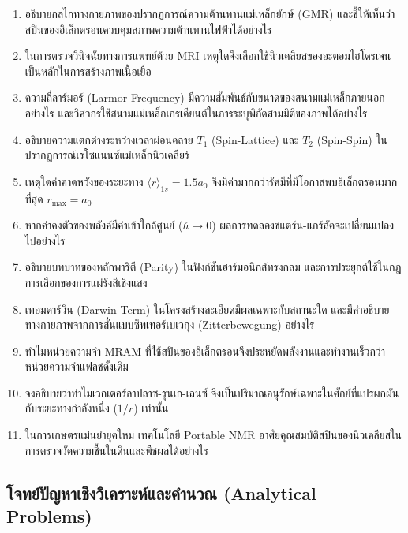 \begin{enumerate}[label=\textbf{\arabic*.}]
    \item อธิบายกลไกทางกายภาพของปรากฏการณ์ความต้านทานแม่เหล็กยักษ์ (GMR) และชี้ให้เห็นว่าสปินของอิเล็กตรอนควบคุมสภาพความต้านทานไฟฟ้าได้อย่างไร
    \item ในการตรวจวินิจฉัยทางการแพทย์ด้วย MRI เหตุใดจึงเลือกใช้นิวเคลียสของอะตอมไฮโดรเจนเป็นหลักในการสร้างภาพเนื้อเยื่อ
    \item ความถี่ลาร์มอร์ (Larmor Frequency) มีความสัมพันธ์กับขนาดของสนามแม่เหล็กภายนอกอย่างไร และวิศวกรใช้สนามแม่เหล็กเกรเดียนต์ในการระบุพิกัดสามมิติของภาพได้อย่างไร
    \item อธิบายความแตกต่างระหว่างเวลาผ่อนคลาย $T_1$ (Spin-Lattice) และ $T_2$ (Spin-Spin) ในปรากฏการณ์เรโซแนนซ์แม่เหล็กนิวเคลียร์
    \item เหตุใดค่าคาดหวังของระยะทาง $\langle r \rangle_{1s} = 1.5 a_0$ จึงมีค่ามากกว่ารัศมีที่มีโอกาสพบอิเล็กตรอนมากที่สุด $r_{\text{max}} = a_0$
    \item หากค่าคงตัวของพลังค์มีค่าเข้าใกล้ศูนย์ ($\hbar \to 0$) ผลการทดลองชแตร์น-แกร์ลัคจะเปลี่ยนแปลงไปอย่างไร
    \item อธิบายบทบาทของหลักพาริตี (Parity) ในฟังก์ชันฮาร์มอนิกส์ทรงกลม และการประยุกต์ใช้ในกฎการเลือกของการแผ่รังสีเชิงแสง
    \item เทอมดาร์วิน (Darwin Term) ในโครงสร้างละเอียดมีผลเฉพาะกับสถานะใด และมีคำอธิบายทางกายภาพจากการสั่นแบบซิทเทอร์เบเวกุง (Zitterbewegung) อย่างไร
    \item ทำไมหน่วยความจำ MRAM ที่ใช้สปินของอิเล็กตรอนจึงประหยัดพลังงานและทำงานเร็วกว่าหน่วยความจำแฟลชดั้งเดิม
    \item จงอธิบายว่าทำไมเวกเตอร์ลาปลาซ-รุนเก-เลนซ์ จึงเป็นปริมาณอนุรักษ์เฉพาะในศักย์ที่แปรผกผันกับระยะทางกำลังหนึ่ง ($1/r$) เท่านั้น
    \item ในการเกษตรแม่นยำยุคใหม่ เทคโนโลยี Portable NMR อาศัยคุณสมบัติสปินของนิวเคลียสในการตรวจวัดความชื้นในดินและพืชผลได้อย่างไร
\end{enumerate}

\subsection*{โจทย์ปัญหาเชิงวิเคราะห์และคำนวณ (Analytical Problems)}

